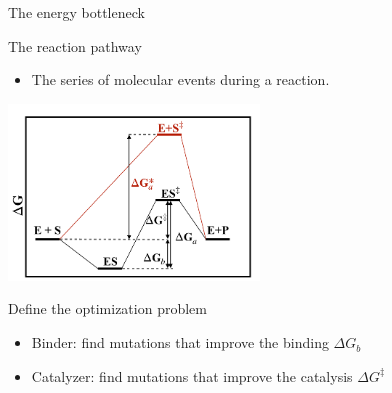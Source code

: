 \documentclass[presentation,smaller]{beamer}
\begin{document}
\begin{frame}[label={sec:org26ceeb9}]{The energy bottleneck}
\begin{block}{The reaction pathway}
\begin{itemize}
\item The series of molecular events during a reaction.
\end{itemize}

\begin{center}
\includegraphics[width=0.5\textwidth]{./img/reaction_pathway.png}
\end{center}
\end{block}

\begin{block}{Define the optimization problem}
\begin{itemize}
\item Binder: find mutations that improve the binding \(\Delta G_{b}\)
\item Catalyzer: find mutations that improve the catalysis \(\Delta G^{\ddagger}\)
\end{itemize}
\end{block}
\end{frame}
\end{document}
